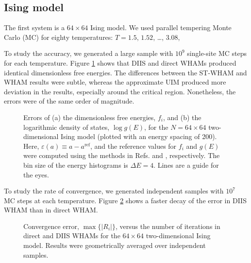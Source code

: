 \documentclass{gMOS2e}
\begin{document}
\subsection{\label{sec:results_Ising}
Ising model}





The first system is
a $64\times64$ Ising model.
%
We used parallel tempering\cite{
swendsen1986, geyer1991, hukushima1996, hansmann1997, earl2005}
Monte Carlo (MC)
for
eighty temperatures: $T = 1.5$, $1.52$, \dots, $3.08$,



To study the accuracy,
we generated a large sample with
$10^9$ single-site MC steps for each temperature.
%
Figure \ref{fig:is2ref} shows that
DIIS and direct WHAMs produced identical
dimensionless free energies.
%
The differences between the ST-WHAM and WHAM results
were subtle,
whereas the approximate UIM
produced more deviation in the results,
especially around the critical region.
%
Nonetheless,
the errors were of the same order of magnitude.



\begin{figure}[h]
\begin{center}
  \caption{
    \label{fig:is2ref}
    Errors of
    (a) the dimensionless free energies, $f_i$, and
    (b) the logarithmic density of states, $\log g(E)$,
    for the $N = 64\times64$ two-dimensional Ising model
    (plotted with an energy spacing of 200).
    Here,
    $\varepsilon(a) \equiv a - a^\mathrm{ref}$,
    and the reference values for $f_i$ and $g(E)$
    were computed using the methods in
    Refs. \cite{ferdinand1969} and \cite{beale1996},
    respectively.
    The bin size of the energy histograms is $\Delta E = 4$.
    Lines are a guide for the eyes.
  }
\end{center}
\end{figure}




To study the rate of convergence,
we generated independent samples with
$10^7$ MC steps at each temperature.
%
Figure \ref{fig:is2trace}
shows a faster decay of the error
in DIIS WHAM
than in direct WHAM.






\begin{figure}[h]
\begin{center}
  \caption{
    \label{fig:is2trace}
    Convergence error, $\max \{ |R_i| \}$,
    versus the number of iterations
    in direct and DIIS WHAMs
    for the $64\times64$ two-dimensional Ising model.
    Results were geometrically averaged over independent samples.
  }
\end{center}
\end{figure}
\end{document}
